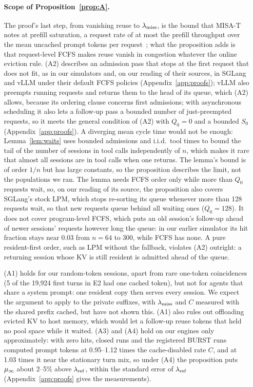 \paragraph{Scope of Proposition~\ref{prop:A}.} The proof's last step, from vanishing reuse to $\lambda_{\mathrm{miss}}$, is the bound that MISA-T notes at prefill saturation, a request rate of at most the prefill throughput over the mean uncached prompt tokens per request~\citep{hong2026misat}; what the proposition adds is that request-level FCFS makes reuse vanish in congestion whatever the online eviction rule. (A2) describes an admission pass that stops at the first request that does not fit, as in our simulators and, on our reading of their sources, in SGLang and vLLM under their default FCFS policies (Appendix~\ref{app:proofs}); vLLM also preempts running requests and returns them to the head of its queue, which (A2) allows, because its ordering clause concerns first admissions; with asynchronous scheduling it also lets a follow-up pass a bounded number of just-preempted requests, so it meets the general condition of (A2) with $Q_0=0$ and a bounded $S_0$ (Appendix~\ref{app:proofs}). A diverging mean cycle time would not be enough: Lemma~\ref{lem:waits} uses bounded admissions and i.i.d.\ tool times to bound the tail of the number of sessions in tool calls independently of $n$, which makes it rare that almost all sessions are in tool calls when one returns. The lemma's bound is of order $1/n$ but has large constants, so the proposition describes the limit, not the populations we ran. The lemma needs FCFS order only while more than $Q_0$ requests wait, so, on our reading of its source, the proposition also covers SGLang's stock LPM, which stops re-sorting its queue whenever more than 128 requests wait, so that new requests queue behind all waiting ones ($Q_0=128$). It does not cover program-level FCFS, which puts an old session's follow-up ahead of newer sessions' requests however long the queue: in our earlier simulator its hit fraction stays near 0.03 from $n=64$ to 300, while FCFS has none. A pure resident-first order, such as LPM without the fallback, violates (A2) outright: a returning session whose KV is still resident is admitted ahead of the queue.

(A1) holds for our random-token sessions, apart from rare one-token coincidences (5 of the 19,924 first turns in E2 had one cached token), but not for agents that share a system prompt: one resident copy then serves every session. We expect the argument to apply to the private suffixes, with $\lambda_{\mathrm{miss}}$ and $C$ measured with the shared prefix cached, but have not shown this. (A1) also rules out offloading evicted KV to host memory, which would let a follow-up reuse tokens that held no pool space while it waited. (A3) and (A4) hold on our engines only approximately: with zero hits, closed runs and the registered BURST runs computed prompt tokens at 0.95--1.12 times the cache-disabled rate $C$, and at 1.03 times it near the stationary turn mix, so under (A4) the proposition puts $\mu_{\infty}$ about 2--5\% above $\lambda_{\mathrm{ref}}$, within the standard error of $\lambda_{\mathrm{ref}}$ (Appendix~\ref{app:proofs} gives the measurements).

